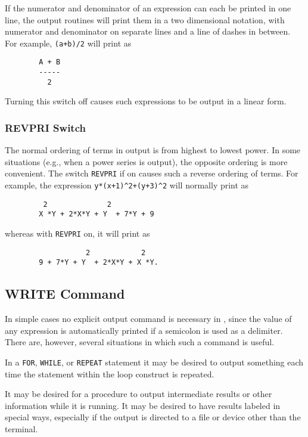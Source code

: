 If the numerator and denominator of an expression can each be printed in
one line, the output routines will print them in a two dimensional
notation, with numerator and denominator on separate lines and a line of
dashes in between. For example, {\tt (a+b)/2} will print as
\begin{verbatim}
        A + B
        -----
          2
\end{verbatim}
Turning this switch off causes such expressions to be output in a linear
form.

\subsubsection{REVPRI Switch}
\hypertarget{switch:REVPRI}{}

The normal ordering of terms in output is from highest to lowest power.
In some situations (e.g., when a power series is output), the opposite
ordering is more convenient.  The switch {\tt REVPRI} if on causes such a
reverse ordering of terms.  For example, the expression
{\tt y*(x+1)\verb|^|2+(y+3)\verb|^|2} will normally print as
\begin{verbatim}
         2              2
        X *Y + 2*X*Y + Y  + 7*Y + 9
\end{verbatim}
whereas with {\tt REVPRI} on, it will print as
\begin{verbatim}
                   2            2
        9 + 7*Y + Y  + 2*X*Y + X *Y.
\end{verbatim}

\hypertarget{WRITE}{\subsection{WRITE Command}}
\hypertarget{command:WRITE}{}

In simple cases no explicit output command is necessary in
{\REDUCE}, since the value of any expression is automatically printed if a
semicolon is used as a delimiter.  There are, however, several situations
in which such a command is useful.

In a {\tt FOR}, {\tt WHILE}, or {\tt REPEAT} statement it may be desired
to output something each time the statement within the loop construct is
repeated.

It may be desired for a procedure to output intermediate results or other
information while it is running. It may be desired to have results labeled
in special ways, especially if the output is directed to a file or device
other than the terminal.

